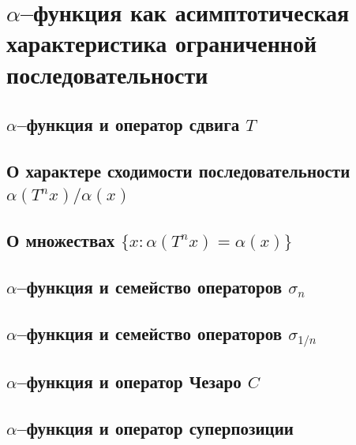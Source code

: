 \documentclass[12pt,a4paper,openbib]{report}
\theoremstyle{definition}
\begin{document}
\chapter{$\alpha$--функция как асимптотическая характеристика ограниченной последовательности}

	

	\section{$\alpha$--функция и оператор сдвига $T$}
	

	\section{О характере сходимости последовательности $\alpha(T^n x)/ \alpha(x)$}
	

	\section{О множествах $\{x: \alpha(T^n x) = \alpha(x)\}$}
	

	\section{$\alpha$--функция и семейство операторов $\sigma_n$}
	

	\section{$\alpha$--функция и семейство операторов $\sigma_{1/n}$}
	

	\section{$\alpha$--функция и оператор Чезаро $C$}
	

	\section{$\alpha$--функция и оператор суперпозиции}
	
\end{document}
